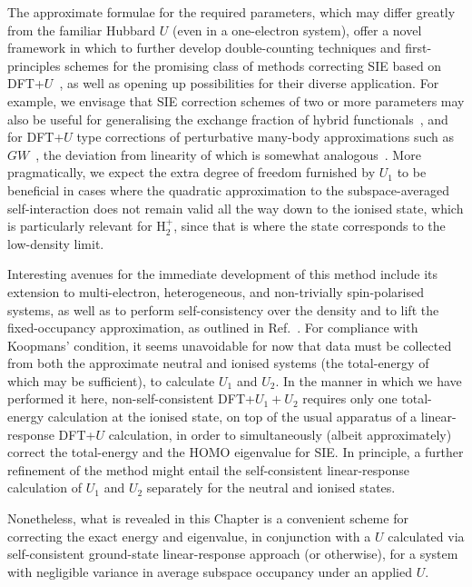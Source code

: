 The approximate formulae for the required parameters, 
which may differ greatly from the familiar Hubbard $U$ 
(even in a one-electron system), 
offer a novel framework in which to further
develop double-counting techniques and first-principles 
schemes for the promising class of methods correcting SIE  
based on DFT+$U$~\cite{QUA:QUA24521,
PhysRevLett.97.103001,
:/content/aip/journal/jcp/145/5/10.1063/1.4959882,
:/content/aip/journal/jcp/133/11/10.1063/1.3489110}, 
as well as opening up possibilities for their diverse application.
%
For example, we envisage that SIE  correction schemes
of two or more parameters may also be useful 
for generalising the exchange fraction of
hybrid functionals~\cite{PhysRevB.94.035140}, 
and for DFT+$U$ type corrections of perturbative many-body 
approximations such as $GW$~\cite{PhysRevB.82.045108}, 
the deviation from linearity of which is somewhat 
analogous~\cite{PhysRevA.75.032505,PhysRevB.93.121115}.
%
More pragmatically, 
we expect the extra degree of freedom furnished by $U_1$ 
to be beneficial in cases where  the quadratic
approximation to the subspace-averaged
self-interaction does not remain valid 
all the way down to the ionised state, 
which is particularly relevant for H$_2^+$, 
since that is where the state corresponds 
to the low-density limit.
%


Interesting avenues for the 
immediate development of this method 
include its extension to multi-electron, heterogeneous,
and non-trivially spin-polarised systems, as well as to
perform self-consistency over the density 
and to lift the fixed-occupancy approximation, 
as outlined in Ref.~\cite{PhysRevB.94.220104}.
%
For compliance with Koopmans' condition, 
it seems unavoidable for now that data must be collected 
from both the approximate neutral and ionised systems
(the total-energy of which may be sufficient), 
to calculate $U_1$ and $U_2$.
%
In the manner in which we have performed it  here, 
non-self-consistent DFT+$U_1+U_2$ 
requires only one total-energy calculation 
at the ionised state, 
on top of the usual apparatus
of a linear-response DFT+$U$ calculation,  
in order to simultaneously 
(albeit approximately) 
correct the total-energy
and the HOMO eigenvalue for SIE.
%
In principle, a further refinement of the
method might entail the self-consistent
linear-response calculation of $U_1$ and $U_2$
separately for the neutral and ionised states.

Nonetheless, 
what is revealed in this Chapter is a convenient scheme 
for correcting the exact energy and eigenvalue, 
in conjunction with a $U$ 
calculated via self-consistent ground-state linear-response approach (or otherwise), 
for a system with negligible variance in 
average subspace occupancy 
under an applied $U$.
%





